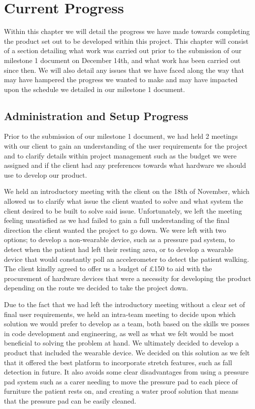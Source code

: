 \chapter{Current Progress}

Within this chapter we will detail the progress we have made towards completing the product set out to be developed within this project. This chapter will consist of a section detailing what work was carried out prior to the submission of our milestone 1 document on December 14th, and what work has been carried out since then. We will also detail any issues that we have faced along the way that may have hampered the progress we wanted to make and may have impacted upon the schedule we detailed in our milestone 1 document.

\section{Administration and Setup Progress}

Prior to the submission of our milestone 1 document, we had held 2 meetings with our client to gain an understanding of the user requirements for the project and to clarify details within project management such as the budget we were assigned and if the client had any preferences towards what hardware we should use to develop our product.

We held an introductory meeting with the client on the 18th of November, which allowed us to clarify what issue the client wanted to solve and what system the client desired to be built to solve said issue. Unfortunately, we left the meeting feeling unsatisfied as we had failed to gain a full understanding of the final direction the client wanted the project to go down. We were left with two options; to develop a non-wearable device, such as a pressure pad system, to detect when the patient had left their resting area, or to develop a wearable device that would constantly poll an accelerometer to detect the patient walking. The client kindly agreed to offer us a budget of £150 to aid with the procurement of hardware devices that were a necessity for developing the product depending on the route we decided to take the project down.

Due to the fact that we had left the introductory meeting without a clear set of final user requirements, we held an intra-team meeting to decide upon which solution we would prefer to develop as a team, both based on the skills we posses in code development and engineering, as well as what we felt would be most beneficial to solving the problem at hand. We ultimately decided to develop a product that included the wearable device. We decided on this solution as we felt that it offered the best platform to incorporate stretch features, such as fall detection in future. It also avoids some clear disadvantages from using a pressure pad system such as a carer needing to move the pressure pad to each piece of furniture the patient rests on, and creating a water proof solution that means that the pressure pad can be easily cleaned.

